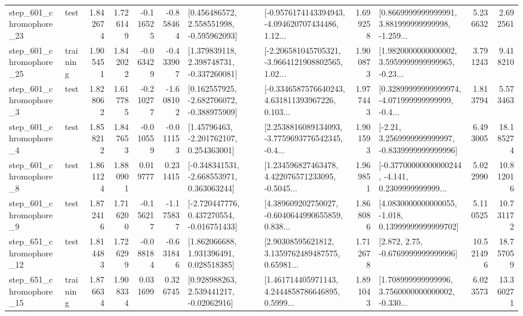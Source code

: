 \begin{tabular}{llrrrrllrlrr}
  step\_601\_chromophore\_23 &      test &      1.842674 &    1.726149 &     -0.116525 & -0.858464 &    [0.456486572, 2.558551998, -0.595962093] &  [-0.9576174143394943, -4.094620707434486, 1.12... &       1.699258 &  [0.8669999999999991, 3.881999999999998, -1.259... &            5.236632 &          2.692561 \\
  step\_601\_chromophore\_25 &  training &      1.905451 &    1.842022 &     -0.063429 & -0.433907 &    [1.379839118, 2.398748731, -0.337260081] &  [-2.206581045705321, -3.9664121908802565, 1.02... &       1.900873 &  [1.9820000000000002, 3.5959999999999965, -0.23... &            3.791243 &          9.418210 \\
   step\_601\_chromophore\_3 &      test &      1.828062 &    1.617785 &     -0.210277 & -1.608102 &   [0.162557925, -2.682706072, -0.388975909] &  [-0.3346587576640243, 4.631811393967226, 0.103... &       1.977443 &  [0.32899999999999974, -4.071999999999999, -0.4... &            1.813794 &          5.573463 \\
   step\_601\_chromophore\_4 &      test &      1.858212 &    1.847653 &     -0.010559 & -0.011153 &     [1.45796463, -2.201762107, 0.254363001] &  [2.2538816089134093, -3.7759693776542345, -0.4... &       1.901593 &   [-2.21, 3.2569999999999997, -0.8339999999999996] &            6.493005 &         18.185274 \\
   step\_601\_chromophore\_8 &      test &      1.861124 &    1.880901 &      0.019777 &  0.231415 &   [-0.348341531, -2.668553971, 0.363063244] &  [1.234596827463478, 4.422076571233095, -0.5045... &       1.969851 &  [-0.37700000000000244, -4.141, 0.2309999999999... &            5.022990 &         10.812016 \\
   step\_601\_chromophore\_9 &      test &      1.872416 &    1.716200 &     -0.156217 & -1.175837 &   [-2.720447776, 0.437270554, -0.016751433] &  [4.389609202750027, -0.6040644990655859, 0.838... &       1.868086 &  [4.0830000000000055, -1.018, 0.13999999999999702] &            5.110525 &         10.731172 \\
  step\_651\_chromophore\_12 &      test &      1.814483 &    1.726299 &     -0.088184 & -0.631846 &     [1.862066688, 1.931396491, 0.028518385] &  [2.90308595621812, 3.1359762489487575, 0.65981... &       1.712678 &                 [2.872, 2.75, -0.6769999999999996] &           10.521496 &         18.757059 \\
  step\_651\_chromophore\_15 &  training &      1.876634 &    1.908334 &      0.031699 &  0.326745 &     [0.928988263, 2.539441217, -0.02062916] &  [1.461714405971143, 4.2444858786646895, 0.5999... &       1.891043 &  [1.708999999999996, 3.7560000000000002, -0.330... &            6.023573 &         13.360271 \\

\end{tabular}
